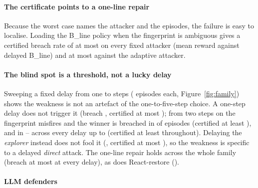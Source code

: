 \documentclass[conference,compsoc]{IEEEtran}
\begin{document}
\paragraph{The certificate points to a one-line repair}
Because the worst case names the attacker and the episodes, the failure is easy to
localise. Loading the B\_line policy when the fingerprint is ambiguous gives a certified
breach rate of at most \CgFixAllBreachCert{} on every fixed attacker (mean reward
\CgFixDelayedReward{} against delayed B\_line) and at most \CgFixAdaptUp{} against the
adaptive attacker.

\paragraph{The blind spot is a threshold, not a lucky delay}
Sweeping a fixed delay from one to \FamDelays{} steps (\FamEps{} episodes each,
Figure~\ref{fig:family}) shows the weakness is not an artefact of the one-to-five-step
choice. A one-step delay does not trigger it (breach \FamChampDOne, certified at most
\FamChampDOneUp); from two steps on the fingerprint misfires and the winner is breached in
\FamChampDTwo{} of episodes (certified at least \FamChampDTwoLo), and in
\FamChampMin--\FamChampMax{} across every delay up to \FamDelays{} (certified at least
\FamChampHiMinLo{} throughout). Delaying the \emph{explorer} instead does not fool it
(\FamChampMeander, certified at most \FamChampMeanderUp), so the weakness is specific to a
delayed \emph{direct} attack. The one-line repair holds across the whole family (breach at
most \FamFixMaxUp{} at every delay), as does React-restore (\FamRestoreMax).

\paragraph{LLM defenders}

\end{document}
